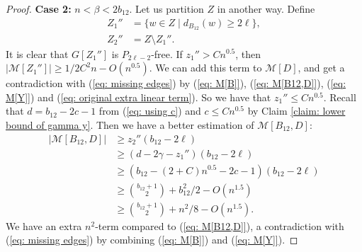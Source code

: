 \documentclass[10pt,a4paper]{amsart}
\begin{document}
\begin{proof}
	\textbf{Case 2:} $n < \beta < 2b_{12}$.
	Let us partition $Z$ in another way.
	Define
	\begin{equation*}
	\begin{aligned}
		Z_1'' &= \{w \in Z \mid d_{B_{12}}(w) \ge 2\ell \},\\
		Z_2'' &= Z\setminus Z_1''.
	\end{aligned}
	\end{equation*}
	It is clear that $G[Z_1'']$ is $P_{2\ell-2}$-free. If $z_1'' > Cn^{0.5}$, then $|\mathcal{M}[Z_1'']|\ge 1/2C^2n-O(n^{0.5})$. We can  add this term to $\mathcal{M}[D]$, and get a contradiction   with (\ref{eq: missing edges}) by (\ref{eq: M[B]}), (\ref{eq: M[B12,D]}), (\ref{eq: M[Y]}) and (\ref{eq: original extra linear term}).
So we have that $z_1'' \le Cn^{0.5}$.
	Recall that $d = b_{12} - 2c - 1$ from (\ref{eq: using c}) and $c\le Cn^{0.5}$ by Claim \ref{claim: lower bound of gamma y}. Then we have a better estimation of $\mathcal{M}[B_{12}, D]$:
	\begin{equation}
	\begin{aligned}
		|\mathcal{M}[B_{12}, D]| & \ge z_2''(b_{12} - 2\ell)\\
		& \ge \left(d - 2\gamma - z_1'' \right) (b_{12} - 2\ell) \\
		& \ge \left(b_{12} - ( 2 + C) n^{0.5} -2c-1 \right) (b_{12} - 2\ell) \\
		& \ge \binom{b_{12}+1}{2} + b_{12}^2/2  - O(n^{1.5}) \\
		& \ge \binom{b_{12}+1}{2} + n^2/8 - O(n^{1.5}).
 	\end{aligned}
	\end{equation}
	We have an extra $n^2$-term compared to (\ref{eq: M[B12,D]}), a contradiction   with (\ref{eq: missing edges}) by combining (\ref{eq: M[B]}) and (\ref{eq: M[Y]}).
\end{proof}
\end{document}
